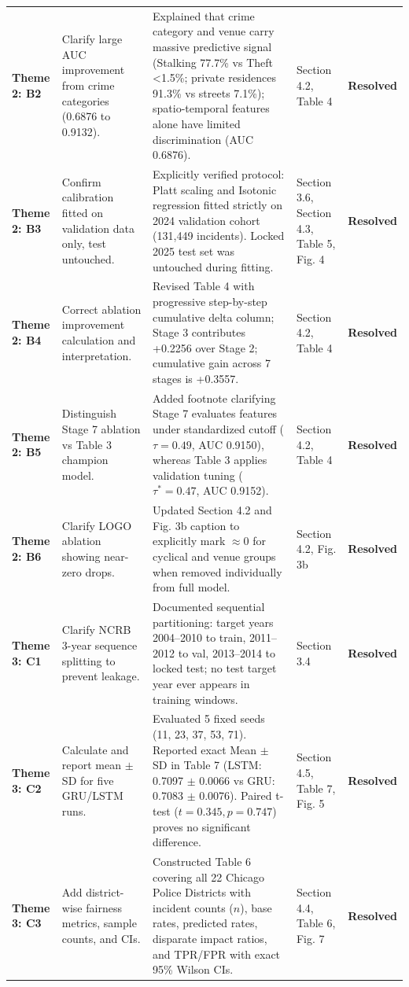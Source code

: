 \documentclass[runningheads]{llncs}
\begin{document}
\begin{table}[ht]
{\begin{tabular}{lp{4.5cm}p{5.5cm}p{3cm}c}
\textbf{Theme 2: B2} & Clarify large AUC improvement from crime categories (0.6876 to 0.9132). & Explained that crime category and venue carry massive predictive signal (Stalking 77.7\% vs Theft <1.5\%; private residences 91.3\% vs streets 7.1\%); spatio-temporal features alone have limited discrimination (AUC 0.6876). & Section 4.2, Table 4 & \textbf{Resolved} \\
\textbf{Theme 2: B3} & Confirm calibration fitted on validation data only, test untouched. & Explicitly verified protocol: Platt scaling and Isotonic regression fitted strictly on 2024 validation cohort (131,449 incidents). Locked 2025 test set was untouched during fitting. & Section 3.6, Section 4.3, Table 5, Fig. 4 & \textbf{Resolved} \\
\textbf{Theme 2: B4} & Correct ablation improvement calculation and interpretation. & Revised Table 4 with progressive step-by-step cumulative delta column; Stage 3 contributes +0.2256 over Stage 2; cumulative gain across 7 stages is +0.3557. & Section 4.2, Table 4 & \textbf{Resolved} \\
\textbf{Theme 2: B5} & Distinguish Stage 7 ablation vs Table 3 champion model. & Added footnote clarifying Stage 7 evaluates features under standardized cutoff ($\tau=0.49$, AUC 0.9150), whereas Table 3 applies validation tuning ($\tau^*=0.47$, AUC 0.9152). & Section 4.2, Table 4 & \textbf{Resolved} \\
\textbf{Theme 2: B6} & Clarify LOGO ablation showing near-zero drops. & Updated Section 4.2 and Fig. 3b caption to explicitly mark $\approx 0$ for cyclical and venue groups when removed individually from full model. & Section 4.2, Fig. 3b & \textbf{Resolved} \\
\midrule
\textbf{Theme 3: C1} & Clarify NCRB 3-year sequence splitting to prevent leakage. & Documented sequential partitioning: target years 2004--2010 to train, 2011--2012 to val, 2013--2014 to locked test; no test target year ever appears in training windows. & Section 3.4 & \textbf{Resolved} \\
\textbf{Theme 3: C2} & Calculate and report mean $\pm$ SD for five GRU/LSTM runs. & Evaluated 5 fixed seeds (11, 23, 37, 53, 71). Reported exact Mean $\pm$ SD in Table 7 (LSTM: 0.7097 $\pm$ 0.0066 vs GRU: 0.7083 $\pm$ 0.0076). Paired t-test ($t=0.345, p=0.747$) proves no significant difference. & Section 4.5, Table 7, Fig. 5 & \textbf{Resolved} \\
\textbf{Theme 3: C3} & Add district-wise fairness metrics, sample counts, and CIs. & Constructed Table 6 covering all 22 Chicago Police Districts with incident counts ($n$), base rates, predicted rates, disparate impact ratios, and TPR/FPR with exact 95\% Wilson CIs. & Section 4.4, Table 6, Fig. 7 & \textbf{Resolved} \\

\end{tabular}}
\end{table}
\end{document}
